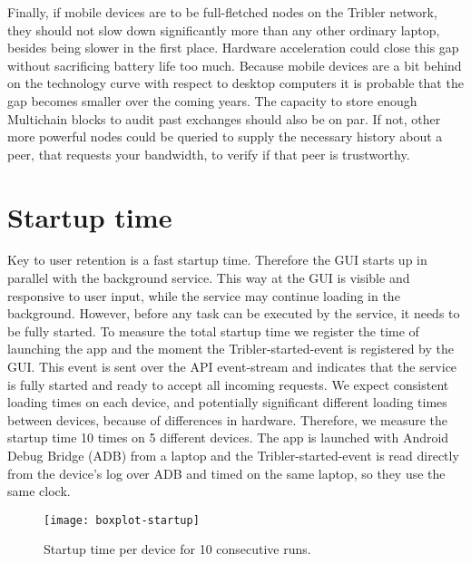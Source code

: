 Finally, if mobile devices are to be full-fletched nodes on the Tribler network, they should not slow down significantly more than any other ordinary laptop, besides being slower in the first place.
Hardware acceleration could close this gap without sacrificing battery life too much.
Because mobile devices are a bit behind on the technology curve with respect to desktop computers it is probable that the gap becomes smaller over the coming years.
The capacity to store enough Multichain blocks to audit past exchanges should also be on par.
If not, other more powerful nodes could be queried to supply the necessary history about a peer, that requests your bandwidth, to verify if that peer is trustworthy.


\section{Startup time}\label{sec:startup_time}
Key to user retention is a fast startup time.
Therefore the GUI starts up in parallel with the background service.
This way at the GUI is visible and responsive to user input, while the service may continue loading in the background.
However, before any task can be executed by the service, it needs to be fully started.
To measure the total startup time we register the time of launching the app and the moment the Tribler-started-event is registered by the GUI.
This event is sent over the API event-stream and indicates that the service is fully started and ready to accept all incoming requests.
We expect consistent loading times on each device, and potentially significant different loading times between devices, because of differences in hardware.
Therefore, we measure the startup time 10 times on 5 different devices.
The app is launched with Android Debug Bridge (ADB) from a laptop and the Tribler-started-event is read directly from the device's log over ADB and timed on the same laptop, so they use the same clock.
\begin{figure}[H]
	\centering %
	\texttt{[image: boxplot-startup]}
	\caption{Startup time per device for 10 consecutive runs.}
	\label{fig:boxplot-startup}
\end{figure}
